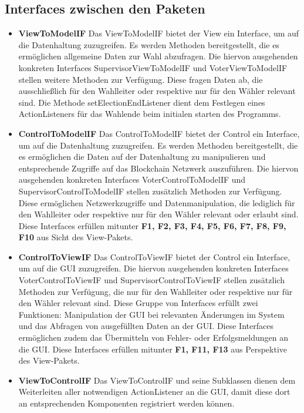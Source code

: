 \documentclass[parskip=full]{scrartcl}
\newcommand{\fakeparagraph}[1]{\textbf{#1}}
\begin{document}
\subsection{Interfaces zwischen den Paketen}
	\begin{itemize}
	\item\fakeparagraph{ViewToModelIF} Das ViewToModelIF bietet der View ein Interface, um auf die Datenhaltung zuzugreifen.
	Es werden Methoden bereitgestellt, die es ermöglichen allgemeine Daten zur Wahl abzufragen.
	Die hiervon ausgehenden konkreten Interfaces SupervisorViewToModelIF und VoterViewToModelIF stellen weitere Methoden zur Verfügung. Diese fragen Daten ab, die ausschließlich für den Wahlleiter oder respektive nur für den Wähler relevant sind.
	Die Methode setElectionEndListener dient dem Festlegen eines ActionListeners für das Wahlende beim initialen starten des Programms.

	\item\fakeparagraph{ControlToModelIF} Das ControlToModelIF bietet der Control ein Interface, um auf die Datenhaltung zuzugreifen.
	Es werden Methoden bereitgestellt, die es ermöglichen die Daten auf der Datenhaltung zu manipulieren und entsprechende Zugriffe auf das Blockchain Netzwerk auszuführen.
	Die hiervon ausgehenden konkreten Interfaces VoterControlToModelIF und SupervisorControlToModelIF stellen zusätzlich Methoden zur Verfügung. Diese ermöglichen Netzwerkzugriffe und Datenmanipulation, die lediglich für den Wahlleiter oder respektive nur für den Wähler relevant oder erlaubt sind.
	Diese Interfaces erfüllen mitunter \textbf{F1, F2, F3, F4, F5, F6, F7, F8, F9, F10} aus Sicht des View-Pakets.

	\item\fakeparagraph{ControlToViewIF} Das ControlToViewIF bietet der Control ein Interface, um auf die GUI zuzugreifen.
	Die hiervon ausgehenden konkreten Interfaces VoterControlToViewIF und SupervisorControlToViewIF stellen zusätzlich Methoden zur Verfügung, die nur für den Wahlleiter oder respektive nur für den Wähler relevant sind. 
	Diese Gruppe von Interfaces erfüllt zwei Funktionen: Manipulation der GUI bei relevanten Änderungen im System und das Abfragen von ausgefüllten Daten an der GUI.
	Diese Interfaces ermöglichen zudem das Übermitteln von Fehler- oder Erfolgsmeldungen an die GUI.
	Diese Interfaces erfüllen mitunter \textbf{F1, F11, F13} aus Perspektive des View-Pakets.

	\item\fakeparagraph{ViewToControlIF} Das ViewToControlIF und seine Subklassen dienen dem Weiterleiten aller notwendigen ActionListener an die GUI, damit diese dort an entsprechenden Komponenten registriert werden können.


\end{itemize}
\end{document}
